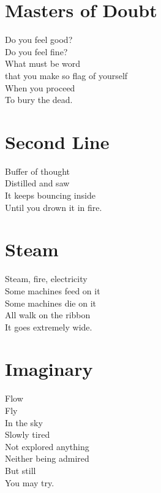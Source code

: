 \documentclass[a4paper,twoside, openany]{book}
\newenvironment{Verse}
  {\center\varwidth{\linewidth}\fontsize{18}{21.6}\selectfont}
  {\endvarwidth\endcenter}
\begin{document}
\chapter{Masters of Doubt}
\begin{Verse}
    Do you feel good?\\
    Do you feel fine?\\
    What must be word\\
    that you make so flag of yourself\\
    When you proceed\\
    To bury the dead.
\end{Verse}


\chapter{Second Line}
\begin{Verse}
    Buffer of thought\\
    Distilled and saw\\
    It keeps bouncing inside\\
    Until you drown it in fire.
\end{Verse}


\chapter{Steam}
\begin{Verse}
    Steam, fire, electricity\\
    Some machines feed on it\\
    Some machines die on it\\
    All walk on the ribbon\\
    It goes extremely wide.
\end{Verse}


\chapter{Imaginary}
\begin{Verse}
    Flow\\
    Fly\\
    In the sky\\
    Slowly tired\\
    Not explored anything\\
    Neither being admired\\
    But still\\
    You may try.
\end{Verse}
\end{document}
